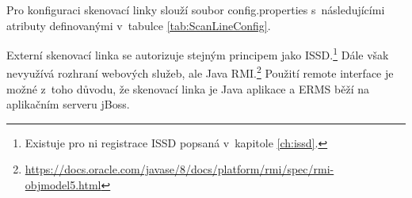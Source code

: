 \documentclass[
  master,
  field=ainfp,
  biblatex,
  language=czech,
  glossaries,
  theorems=false,
  index
]{kidiplom}
\begin{document}
Pro konfiguraci skenovací linky slouží soubor config.properties s~následujícími atributy definovanými v~tabulce \ref{tab:ScanLineConfig}.
\begin{table}
\begin{center}
\caption{Konfigurační parametry skenovací linky}\label{tab:ScanLineConfig}
\end{center}
\end{table}

Externí skenovací linka se autorizuje stejným principem jako ISSD.\footnote{Existuje pro ni registrace ISSD popsaná v~kapitole \ref{ch:issd}.} Dále však nevyužívá rozhraní webových služeb, ale Java RMI.\footnote{\url{https://docs.oracle.com/javase/8/docs/platform/rmi/spec/rmi-objmodel5.html}} Použití remote interface je možné z~toho důvodu, že skenovací linka je Java aplikace a ERMS běží na aplikačním serveru jBoss.
\end{document}
